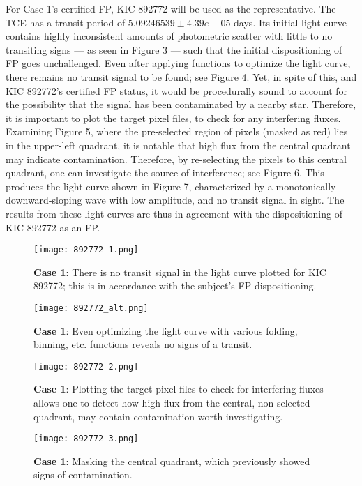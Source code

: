 \documentclass[onecolumn, 12pt]{article}
\begin{document}
For Case 1's certified FP, KIC 892772 will be used as the representative. The TCE has a transit period of $5.09246539 \pm 4.39e-05$ days. Its initial light curve contains highly inconsistent amounts of photometric scatter with little to no transiting signs — as seen in Figure 3 — such that the initial dispositioning of FP goes unchallenged. Even after applying functions to optimize the light curve, there remains no transit signal to be found; see Figure 4. Yet, in spite of this, and KIC 892772's certified FP status, it would be procedurally sound to account for the possibility that the signal has been contaminated by a nearby star. Therefore, it is important to plot the target pixel files, to check for any interfering fluxes. Examining Figure 5, where the pre-selected region of pixels (masked as red) lies in the upper-left quadrant, it is notable that high flux from the central quadrant may indicate contamination. Therefore, by re-selecting the pixels to  this central quadrant, one can investigate the source of interference; see Figure 6. This produces the light curve shown in Figure 7, characterized by a monotonically downward-sloping wave with low amplitude, and no transit signal in sight. The results from these light curves are thus in agreement with the dispositioning of KIC 892772 as an FP.

\begin{figure}[p]
\centering
\texttt{[image: 892772-1.png]}
\caption{\textbf{Case 1}: There is no transit signal in the light curve plotted for KIC 892772; this is in accordance with the subject's FP dispositioning.}
\end{figure}

\begin{figure}[p]
\centering
\texttt{[image: 892772\_alt.png]}
\caption{\textbf{Case 1}: Even optimizing the light curve with various folding, binning, etc. functions reveals no signs of a transit.}
\end{figure}

\begin{figure}[p]
\centering
\texttt{[image: 892772-2.png]}
\caption{\textbf{Case 1}: Plotting the target pixel files to check for interfering fluxes allows one to detect how high flux from the central, non-selected quadrant, may contain contamination worth investigating.}
\end{figure}

\begin{figure}[p]
\centering
\texttt{[image: 892772-3.png]}
\caption{\textbf{Case 1}: Masking the central quadrant, which previously showed signs of contamination.}
\end{figure}
\end{document}
